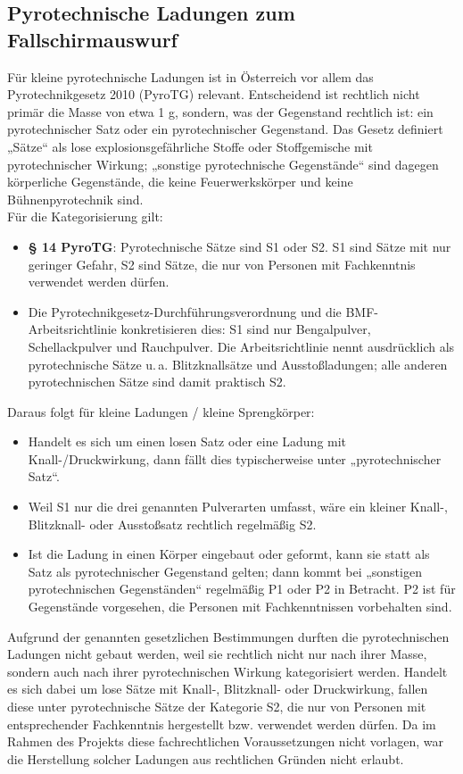\subsection{Pyrotechnische Ladungen zum Fallschirmauswurf}
\label{subsec:pyro_charges_legal}
Für kleine pyrotechnische Ladungen ist in Österreich vor allem das Pyrotechnikgesetz 2010 (PyroTG) relevant. Entscheidend ist rechtlich nicht primär die Masse von etwa 1 g, sondern, was der Gegenstand rechtlich ist: ein pyrotechnischer Satz oder ein pyrotechnischer Gegenstand. Das Gesetz definiert „Sätze“ als lose explosionsgefährliche Stoffe oder Stoffgemische mit pyrotechnischer Wirkung; „sonstige pyrotechnische Gegenstände“ sind dagegen körperliche Gegenstände, die keine Feuerwerkskörper und keine Bühnenpyrotechnik sind. \\
Für die Kategorisierung gilt:
\begin{itemize}
    \item \textbf{§ 14 PyroTG}: Pyrotechnische Sätze sind S1 oder S2. S1 sind Sätze mit nur geringer Gefahr, S2 sind Sätze, die nur von Personen mit Fachkenntnis verwendet werden dürfen.
    \item Die Pyrotechnikgesetz-Durchführungsverordnung und die BMF-Arbeitsrichtlinie konkretisieren dies: S1 sind nur Bengalpulver, Schellackpulver und Rauchpulver. Die Arbeitsrichtlinie nennt ausdrücklich als pyrotechnische Sätze u.\,a. Blitzknallsätze und Ausstoßladungen; alle anderen pyrotechnischen Sätze sind damit praktisch S2.
\end{itemize}
Daraus folgt für kleine Ladungen / kleine Sprengkörper:
\begin{itemize}
    \item Handelt es sich um einen losen Satz oder eine Ladung mit Knall-/Druckwirkung, dann fällt dies typischerweise unter „pyrotechnischer Satz“.
    \item Weil S1 nur die drei genannten Pulverarten umfasst, wäre ein kleiner Knall-, Blitzknall- oder Ausstoßsatz rechtlich regelmäßig S2.
    \item Ist die Ladung in einen Körper eingebaut oder geformt, kann sie statt als Satz als pyrotechnischer Gegenstand gelten; dann kommt bei „sonstigen pyrotechnischen Gegenständen“ regelmäßig P1 oder P2 in Betracht. P2 ist für Gegenstände vorgesehen, die Personen mit Fachkenntnissen vorbehalten sind.
\end{itemize}
Aufgrund der genannten gesetzlichen Bestimmungen durften die pyrotechnischen Ladungen nicht gebaut werden, weil sie rechtlich nicht nur nach ihrer Masse, sondern auch nach ihrer pyrotechnischen Wirkung kategorisiert werden. Handelt es sich dabei um lose Sätze mit Knall-, Blitzknall- oder Druckwirkung, fallen diese unter pyrotechnische Sätze der Kategorie S2, die nur von Personen mit entsprechender Fachkenntnis hergestellt bzw. verwendet werden dürfen. Da im Rahmen des Projekts diese fachrechtlichen Voraussetzungen nicht vorlagen, war die Herstellung solcher Ladungen aus rechtlichen Gründen nicht erlaubt. \cite{ChatGPT}

